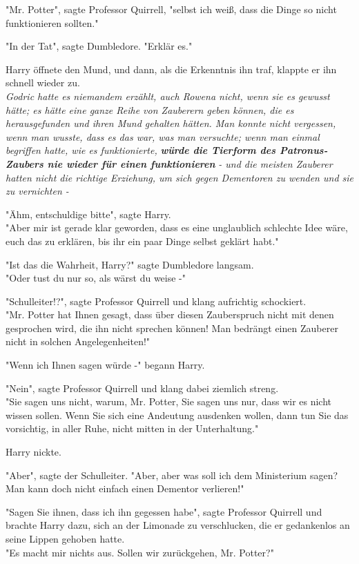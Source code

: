 {"Mr. Potter", sagte Professor Quirrell, "selbst ich weiß, dass die Dinge so nicht funktionieren sollten."

"In der Tat", sagte Dumbledore. "Erklär es."

Harry öffnete den Mund, und dann, als die Erkenntnis ihn traf, klappte er ihn schnell wieder zu.\\ \emph{Godric hatte es niemandem erzählt, auch Rowena nicht, wenn sie es gewusst hätte; es hätte eine ganze Reihe von Zauberern geben können, die es herausgefunden und ihren Mund gehalten hätten. Man konnte nicht vergessen, wenn man wusste, dass es das war, was man versuchte; wenn man einmal begriffen hatte, wie es funktionierte,} \textbf{\emph{würde die Tierform des Patronus-Zaubers nie wieder für einen funktionieren}} \emph{- und die meisten Zauberer hatten nicht die richtige Erziehung, um sich gegen Dementoren zu wenden und sie zu vernichten -}

"Ähm, entschuldige bitte", sagte Harry.\\ "Aber mir ist gerade klar geworden, dass es eine unglaublich schlechte Idee wäre, euch das zu erklären, bis ihr ein paar Dinge selbst geklärt habt."

"Ist das die Wahrheit, Harry?" sagte Dumbledore langsam.\\ "Oder tust du nur so, als wärst du weise -"

"Schulleiter!?", sagte Professor Quirrell und klang aufrichtig schockiert.\\ "Mr. Potter hat Ihnen gesagt, dass über diesen Zauberspruch nicht mit denen gesprochen wird, die ihn nicht sprechen können! Man bedrängt einen Zauberer nicht in solchen Angelegenheiten!"

"Wenn ich Ihnen sagen würde -" begann Harry.

"Nein", sagte Professor Quirrell und klang dabei ziemlich streng.\\ "Sie sagen uns nicht, warum, Mr. Potter, Sie sagen uns nur, dass wir es nicht wissen sollen. Wenn Sie sich eine Andeutung ausdenken wollen, dann tun Sie das vorsichtig, in aller Ruhe, nicht mitten in der Unterhaltung."

Harry nickte.

"Aber", sagte der Schulleiter. "Aber, aber was soll ich dem Ministerium sagen? Man kann doch nicht einfach einen Dementor verlieren!"

"Sagen Sie ihnen, dass ich ihn gegessen habe", sagte Professor Quirrell und brachte Harry dazu, sich an der Limonade zu verschlucken, die er gedankenlos an seine Lippen gehoben hatte.\\ "Es macht mir nichts aus. Sollen wir zurückgehen, Mr. Potter?"

}
